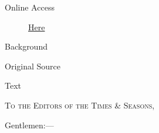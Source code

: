 			\begin{description}
				\item[Online Access] \href{https://www.josephsmithpapers.org/paper-summary/letter-to-editors-6may-1841/1}{Here}
			\end{description}
			
			\begin{description}
				\item[Background]
			\end{description}
			
			
			\begin{description}
				\item[Original Source]
			\end{description}
			
			
			\begin{description}
				\item[Text]
			\end{description}
			

				\textsc{To the Editors of the Times \& Seasons,}

				Gentlemen:---

